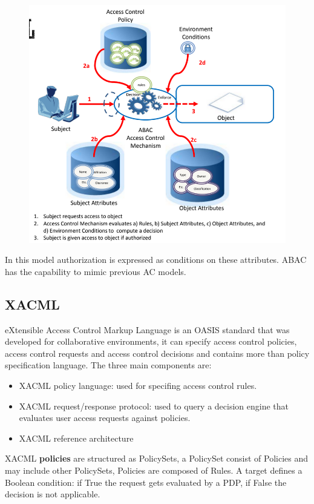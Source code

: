\begin{figure}[h!]
    \centering
    \includegraphics[scale=0.35]{images/abac.png}
\end{figure}

\FloatBarrier

In this model authorization is expressed as conditions on these attributes. ABAC has the capability to mimic previous AC models.

\subsection{XACML}
eXtensible Access Control Markup Language is an OASIS standard that was developed for collaborative environments, it can specify access control policies, access control requests and access control decisions and contains more than policy specification language. The three main components are:
\begin{itemize}
    \item XACML policy language: used for specifing access control rules.
    \item XACML request/response protocol: used to query a decision engine that evaluates user access requests against policies.
    \item XACML reference architecture
\end{itemize}
XACML \textbf{policies} are structured as PolicySets, a PolicySet consist of Policies and may include other PolicySets, Policies are composed of Rules. A target defines a Boolean condition: if True the request gets evaluated by a PDP, if False the decision is not applicable.

